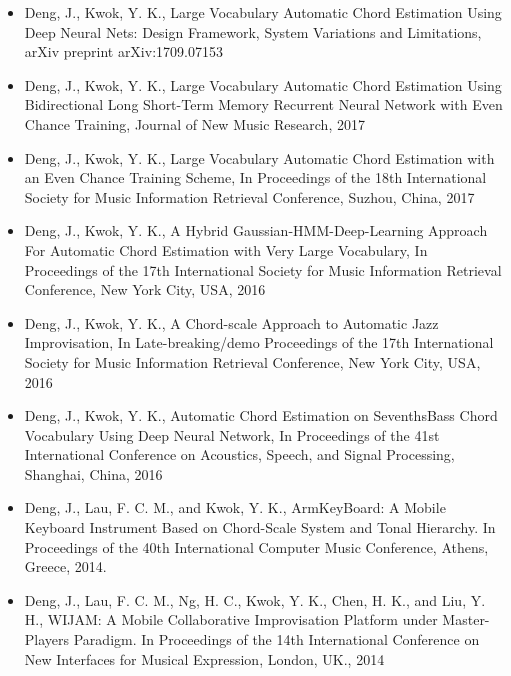 \begin{itemize}
\item Deng, J., Kwok, Y. K., Large Vocabulary Automatic Chord Estimation Using Deep Neural Nets: Design Framework, System Variations and Limitations, arXiv preprint arXiv:1709.07153
\item Deng, J., Kwok, Y. K., Large Vocabulary Automatic Chord Estimation Using Bidirectional Long Short-Term Memory Recurrent Neural Network with Even Chance Training, Journal of New Music Research, 2017
\item Deng, J., Kwok, Y. K., Large Vocabulary Automatic Chord Estimation with an Even Chance Training Scheme, In Proceedings of the 18th International Society for Music Information Retrieval Conference, Suzhou, China, 2017
\item Deng, J., Kwok, Y. K., A Hybrid Gaussian-HMM-Deep-Learning Approach For Automatic Chord Estimation with Very Large Vocabulary, In Proceedings of the 17th International Society for Music Information Retrieval Conference, New York City, USA, 2016
\item Deng, J., Kwok, Y. K., A Chord-scale Approach to Automatic Jazz Improvisation, In Late-breaking/demo Proceedings of the 17th International Society for Music Information Retrieval Conference, New York City, USA, 2016
\item Deng, J., Kwok, Y. K., Automatic Chord Estimation on SeventhsBass Chord Vocabulary Using Deep Neural Network, In Proceedings of the 41st International Conference on Acoustics, Speech, and Signal Processing, Shanghai, China, 2016
\item Deng, J., Lau, F. C. M., and Kwok, Y. K., ArmKeyBoard: A Mobile Keyboard Instrument Based on Chord-Scale System and Tonal Hierarchy. In Proceedings of the 40th International Computer Music Conference, Athens, Greece, 2014.
\item Deng, J., Lau, F. C. M., Ng, H. C., Kwok, Y. K., Chen, H. K., and Liu, Y. H., WIJAM: A Mobile Collaborative Improvisation Platform under Master-Players Paradigm. In Proceedings of the 14th International Conference on New Interfaces for Musical Expression, London, UK., 2014
\end{itemize}




